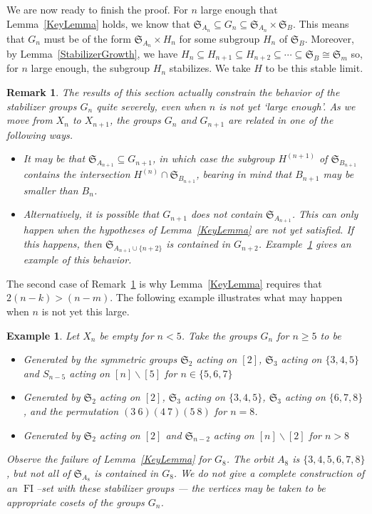\documentclass[10pt]{amsart}
\DeclareMathOperator{\FI}{FI}
\newcommand{\Sn}{\mathfrak{S}}
\newtheorem{example}[theorem]{Example}
\newtheorem{remark}[theorem]{Remark}
\theoremstyle{definition}
\begin{document}
We are now ready to finish the proof. For $n$ large enough that Lemma~\ref{KeyLemma} holds, we know that $\Sn_{A_n} \subseteq G_n \subseteq \Sn_{A_n} \times \Sn_{B}$. This means that $G_n$ must be of the form $\Sn_{A_n} \times H_n$ for some subgroup $H_n$ of $\Sn_B$. Moreover, by Lemma~\ref{StabilizerGrowth}, we have $H_n \subseteq H_{n+1} \subseteq H_{n+2} \subseteq \cdots \subseteq \Sn_B \cong \Sn_m$ so, for $n$ large enough, the subgroup $H_n$ stabilizes. We take $H$ to be this stable limit. \qedsymbol

\begin{remark}
\label{rem:stabgroupbehavior}
The results of this section actually constrain the behavior of the stabilizer groups $G_n$ quite severely, even when $n$ is not yet `large enough'. As we move from $X_n$ to $X_{n+1}$, the groups $G_n$ and $G_{n+1}$ are related in one of the following ways.
\begin{itemize}
\item It may be that $\Sn_{A_{n+1}} \subseteq G_{n+1}$, in which case the subgroup $H^{(n+1)}$ of $\Sn_{B_{n+1}}$ contains the intersection $H^{(n)} \cap \Sn_{B_{n+1}}$, bearing in mind that $B_{n+1}$ may be smaller than $B_n$.
\item Alternatively, it is possible that $G_{n+1}$ does not contain $\Sn_{A_{n+1}}$. This can only happen when the hypotheses of Lemma~\ref{KeyLemma} are not yet satisfied. If this happens, then $\Sn_{A_{n+1} \cup \{n+2\}}$ is contained in $G_{n+2}$. Example~\ref{ex:wreath} gives an example of this behavior.
\end{itemize}
\end{remark} 

The second case of Remark~\ref{rem:stabgroupbehavior} is why Lemma~\ref{KeyLemma} requires that $2(n-k) > (n-m)$. The following example illustrates what may happen when $n$ is not yet this large.

\begin{example}
\label{ex:wreath}
Let $X_n$ be empty for $n < 5$. Take the groups $G_n$ for $n \geq 5$ to be
\begin{itemize}
\item Generated by the symmetric groups $\Sn_{2}$ acting on $[2]$, $\Sn_3$ acting on $\{3,4,5\}$ and $S_{n-5}$ acting on $[n] \backslash [5]$ for $n \in \{5,6,7\}$
\item Generated by $\Sn_{2}$ acting on $[2]$, $\Sn_3$ acting on $\{3,4,5\}$, $\Sn_{3}$ acting on $\{6,7,8\}$, and the permutation $(3 \: 6)(4 \: 7)(5 \: 8)$ for $n = 8$.
\item Generated by $\Sn_{2}$ acting on $[2]$ and $\Sn_{n-2}$ acting on $[n] \backslash [2]$ for $n > 8$
\end{itemize}
Observe the failure of Lemma~\ref{KeyLemma} for $G_8$. The orbit $A_8$ is $\{3,4,5,6,7,8\}$, but not all of $\Sn_{A_8}$ is contained in $G_8$. We do not give a complete construction of an $\FI$--set with these stabilizer groups --- the vertices may be taken to be appropriate cosets of the groups $G_n$.
\end{example}
\end{document}

